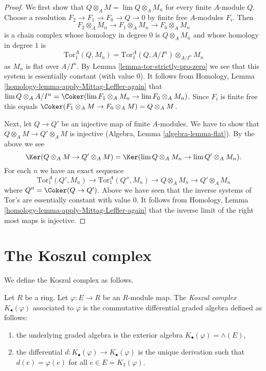 \begin{proof}
We first show that $Q \otimes_A M = \lim Q \otimes_A M_n$ for every finite
$A$-module $Q$. Choose a resolution $F_2 \to F_1 \to F_0 \to Q \to 0$
by finite free $A$-modules $F_i$. Then
$$
F_2 \otimes_A M_n \to F_1 \otimes_A M_n \to F_0 \otimes_A M_n
$$
is a chain complex whose homology in degree $0$ is $Q \otimes_A M_n$
and whose homology in degree $1$ is
$$
\text{Tor}_1^A(Q, M_n) = \text{Tor}_1^A(Q, A/I^n) \otimes_{A/I^n} M_n
$$
as $M_n$ is flat over $A/I^n$. By Lemma \ref{lemma-tor-strictly-pro-zero}
we see that this system is essentially constant (with value $0$).
It follows from Homology, Lemma \ref{homology-lemma-apply-Mittag-Leffler-again}
that $\lim Q \otimes_A A/I^n =
\Coker(\lim F_1 \otimes_A M_n \to \lim F_0 \otimes_A M_n)$.
Since $F_i$ is finite free this equals
$\Coker(F_1 \otimes_A M \to F_0 \otimes_A M) = Q \otimes_A M$.

\medskip\noindent
Next, let $Q \to Q'$ be an injective map of finite $A$-modules.
We have to show that $Q \otimes_A M \to Q' \otimes_A M$ is injective
(Algebra, Lemma \ref{algebra-lemma-flat}). By the above we see
$$
\Ker(Q \otimes_A M \to Q' \otimes_A M) =
\Ker(\lim Q \otimes_A M_n \to \lim Q' \otimes_A M_n).
$$
For each $n$ we have an exact sequence
$$
\text{Tor}_1^A(Q', M_n) \to \text{Tor}_1^A(Q'', M_n) \to
Q \otimes_A M_n \to Q' \otimes_A M_n
$$
where $Q'' = \Coker(Q \to Q')$. Above we have seen that the
inverse systems of Tor's are essentially constant with value $0$.
It follows from
Homology, Lemma \ref{homology-lemma-apply-Mittag-Leffler-again}
that the inverse limit of the right most maps is injective.
\end{proof}











\section{The Koszul complex}
\label{section-koszul}

\noindent
We define the Koszul complex as follows.

\begin{definition}
\label{definition-koszul}
Let $R$ be a ring. Let $\varphi : E \to R$ be an $R$-module map. The
{\it Koszul complex} $K_\bullet(\varphi)$ associated to $\varphi$
is the commutative differential graded algebra defined as follows:
\begin{enumerate}
\item the underlying graded algebra is the exterior algebra
$K_\bullet(\varphi) = \wedge(E)$,
\item the differential $d : K_\bullet(\varphi) \to K_\bullet(\varphi)$
is the unique derivation such that $d(e) = \varphi(e)$ for all
$e \in E = K_1(\varphi)$.
\end{enumerate}
\end{definition}

